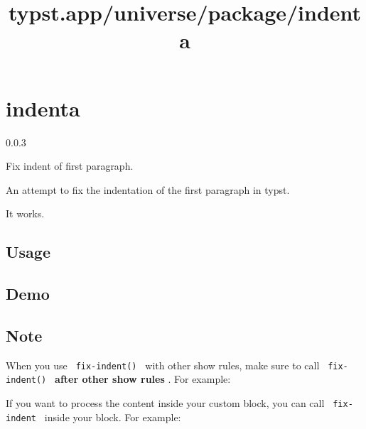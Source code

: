 \title{typst.app/universe/package/indenta}

\label{banner}
\section{indenta}\label{indenta}

{ 0.0.3 }

Fix indent of first paragraph.

\label{readme}
An attempt to fix the indentation of the first paragraph in typst.

It works.

\subsection{Usage}\label{usage}

\begin{Shaded}
\begin{Highlighting}[]
\end{Highlighting}
\end{Shaded}

\subsection{Demo}\label{demo}


\subsection{Note}\label{note}

When you use \texttt{\ fix-indent()\ } with other show rules, make sure
to call \texttt{\ fix-indent()\ } \textbf{after other show rules} . For
example:

\begin{Shaded}
\begin{Highlighting}[]
\end{Highlighting}
\end{Shaded}

If you want to process the content inside your custom block, you can
call \texttt{\ fix-indent\ } inside your block. For example:


